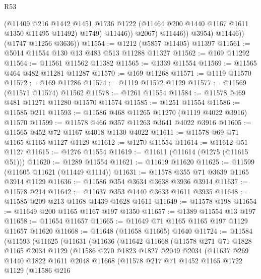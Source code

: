 \begin{lexlean}{R53}
\begin{coremodule}
                      (@11409
                        @216
                        @1442
                        @1451
                        @1736
                        @1722
                        (@11464 @200 @1440 @1167 @1611 @1350 @11495 @11492)
                        @1749)
                      @11446))
                  @2067)
                @11446))
            @3954)
          @11446))
      (@1747 @11256 @3636))
@11554 := @1212 (@5857 @11405) @11397
@11561 := @5014 @11554 @130 @13 @483 @513 @11288 @11327
@11562 := @169 @11292
@11564 := @11561 @11562 @11382
@11565 := @1339 @11554
@11569 := @11565 @464 @482 @11281 @11287
@11570 := @169 @11268
@11571 := @1119 @11570
@11572 := @169 @11286
@11574 := @1119 @11572 @1129
@11577 := @11569 (@11571 @11574) @11562
@11578 := @1261 @11554
@11584 := @11578 @469 @481 @11271 @11280 @11570 @11574
@11585 := @1251 @11554
@11586 := @11585 @211
@11593 := @11586 @468 @11265 @11270 (@1119 @4022 @3916) @11570
@11599 := @11578 @466 @357 @11263 @3641 @4022 @3916
@11605 := @11565 @452 @72 @1167 @4018 @1130 @4022
@11611 := @11578 @69 @71 @1165 @1165 @1127 @1129
@11612 := @1270 @11554
@11614 := @11612 @51 @1127
@11615 := @1276 @11554
@11619 := @11611 (@11614 (@1275 (@11615 @51)))
@11620 := @1289 @11554
@11621 := @11619 @11620
@11625 := @11599 (@11605 @11621 (@11449 @1114))
@11631 := @11578 @355 @71 @3639 @1165 @3914 @1129
@11636 := @11586 @354 @3634 @3638 @3936 @3914
@11637 := @11578 @214
@11642 := @11637 @353 @1440 @3633 @1611 @3935
@11648 := @11585 @209 @213 @1168 @1439 @1628 @1611
@11649 := @11578 @198
@11654 := @11649 @200 @1165 @1167 @197 @1350
@11657 := @1389 @11554 @13 @197
@11658 := @11654 @11657
@11665 := @11649 @71 @1165 @1165 @197 @1129 @11657 @11620
@11668 := @11648 (@11658 @11665) @1640
@11724 := @11584
    (@11593
      (@11625
        (@11631
          (@11636
            (@11642
              @11668
              (@11578
                @271
                @71
                @1828
                @1165
                @2034
                @1129
                (@11586
                  @270
                  @1823
                  @1827
                  @2049
                  @2034
                  (@11637
                    @269
                    @1440
                    @1822
                    @1611
                    @2048
                    @11668
                    (@11578
                      @217
                      @71
                      @1452
                      @1165
                      @1722
                      @1129
                      (@11586
                        @216

\end{coremodule}
\end{lexlean}
